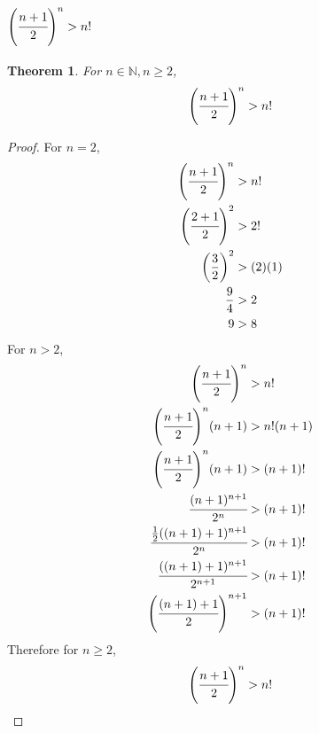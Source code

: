 \documentclass[]{article}
\newcommand{\N}{\mathbb{N}}
\newtheorem{theorem}{Theorem}
\begin{document}
\subsection{
    $\qty(\cfrac{n+1}{2})^n > n!$
}
\begin{theorem} For $n \in \N, n \geq 2$,
    $$\qty(\cfrac{n+1}{2})^n > n!$$
\end{theorem}
\begin{proof}
    For $n=2$,
    \begin{align*}
        \qty(\cfrac{n+1}{2})^n &> n!\\
        \qty(\cfrac{2+1}{2})^2 &> 2!\\
        \qty(\frac{3}{2})^2 &> (2)(1)\\
        \frac{9}{4} &> 2\\
        9 &> 8
    \end{align*}
    For $n>2$,
    \begin{align*}
        \qty(\cfrac{n+1}{2})^n &> n!\\
        \qty(\cfrac{n+1}{2})^n (n+1) &> n! (n+1)\\
        \qty(\cfrac{n+1}{2})^n (n+1) &> (n+1)!\\
        \cfrac{(n+1)^{n+1}}{2^n} &> (n+1)!\\
        \cfrac{\frac{1}{2}((n+1)+1)^{n+1}}{2^n} &> (n+1)!\\
        \cfrac{((n+1)+1)^{n+1}}{2^{n+1}} &> (n+1)!\\
        \qty(\cfrac{(n+1)+1}{2})^{n+1} &> (n+1)!\\
    \end{align*}
    Therefore for $n\geq 2$,
    $$\qty(\cfrac{n+1}{2})^n > n!$$
\end{proof}

\newpage
\end{document}
